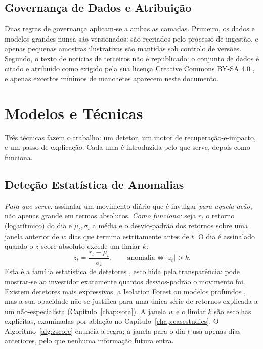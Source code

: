 \subsection{Governança de Dados e Atribuição}
\label{sec:met_data_gov}

Duas regras de governança aplicam-se a ambas as camadas. Primeiro, os dados e modelos grandes nunca são
versionados: são recriados pelo processo de ingestão, e apenas pequenas amostras ilustrativas são mantidas
sob controlo de versões. Segundo, o texto de notícias de terceiros não é republicado: o conjunto de dados é
citado e atribuído como exigido pela sua licença Creative Commons BY-SA 4.0 \autocite{dong2024fnspid}, e
apenas excertos mínimos de manchetes aparecem neste documento.

\section{Modelos e Técnicas}
\label{sec:met_techniques}

Três técnicas fazem o trabalho: um detetor, um motor de recuperação-e-impacto, e um passo de explicação.
Cada uma é introduzida pelo que serve, depois como funciona.

\subsection{Deteção Estatística de Anomalias}
\label{sec:met_anomaly}

\emph{Para que serve:} assinalar um movimento diário que é invulgar \emph{para aquela ação}, não apenas
grande em termos absolutos. \emph{Como funciona:} seja $r_t$ o retorno (logarítmico) do dia e $\mu_t,\sigma_t$
a média e o desvio-padrão dos retornos sobre uma janela anterior de $w$ dias que termina estritamente antes
de $t$. O dia é assinalado quando o $z$-score absoluto excede um limiar $k$:
\begin{equation}
z_t = \frac{r_t - \mu_t}{\sigma_t}, \qquad \text{anomalia} \iff |z_t| > k .
\label{eq:zscore}
\end{equation}
Esta é a família estatística de detetores \autocite{chandola2009anomaly}, escolhida pela transparência: pode
mostrar-se ao investidor exatamente quantos desvios-padrão o movimento foi. Existem detetores mais
expressivos, a Isolation Forest \autocite{liu2008isolation} ou modelos profundos \autocite{pang2021deep},
mas a sua opacidade não se justifica para uma única série de retornos explicada a um não-especialista
(Capítulo~\ref{chap:sota}). A janela $w$ e o limiar $k$ são escolhas explícitas, examinadas por ablação no
Capítulo~\ref{chap:casestudies}. O Algoritmo~\ref{alg:zscore} enuncia a regra; a janela para o dia $t$ usa
apenas dias anteriores, pelo que nenhuma informação futura entra.

